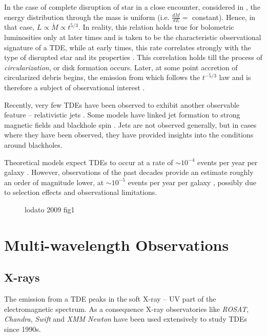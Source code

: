 \documentclass{tda}
\begin{document}
\noindent In the case of complete disruption of star in a close encounter, considered in \cite{evans_tidal_1989, lodato_stellar_2009}, the energy distribution through the mass is uniform (i.e. \(\frac{dM}{dE} = \) constant). Hence, in that case, \(L \propto \dot{M} \propto t^{5/3}\). In reality, this relation holds true for bolometric luminosities only at later times \cite{lodato_stellar_2009, lodato_multiband_2011} and is taken to be the characteristic observational signature of a TDE, while at early times, this rate correlates strongly with the type of disrupted star and its properties \cite{lodato_stellar_2009, lodato_recent_2015, guillochon_hydrodynamical_2013}. This correlation holds till the process of \emph{circularization}, or disk formation occurs. Later, at some point accretion of circularized debris begins, the emission from which follows the \(t^{-5/3}\) law and is therefore a subject of observational interest \cite{piran_disk_2015}.

Recently, very few TDEs have been observed to exhibit another observable feature -- relativistic jets \cite{lodato_recent_2015}. Some models have linked jet formation to strong magnetic fields and blackhole spin \cite{dai_unified_2018}. Jets are not observed generally, but in cases where they have been observed, they have provided insights into the conditions around blackholes.

Theoretical models expect TDEs to occur at a rate of \(\sim 10^{-4}\) events per year per galaxy \cite{magorrian_rates_1999}. However, observations of the past decades provide an estimate roughly an order of magnitude lower, at \(\sim 10^{-5}\) events per year per galaxy \cite{stone_rates_2016}, possibly due to selection effects and observational limitations.

\begin{figure}
	\caption{lodato 2009 fig1}
\end{figure}

\section{Multi-wavelength Observations}

\subsection{X-rays} \label{subsec:xrays}

The emission from a TDE peaks in the soft X-ray -- UV part of the electromagnetic spectrum. As a consequence X-ray observatories like \textit{ROSAT}, \textit{Chandra}, \textit{Swift} and \textit{XMM Newton} have been used extensively to study TDEs since 1990s.
\end{document}
